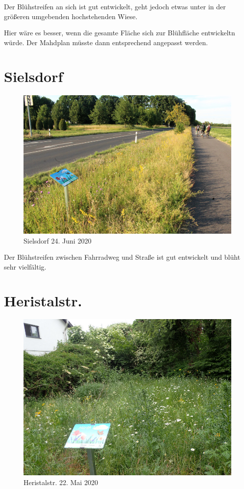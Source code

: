 \documentclass[10pt]{article}
\begin{document}
Der Blühstreifen an sich ist gut entwickelt, geht jedoch etwas unter in der größeren umgebenden hochstehenden Wiese.

Hier wäre es besser, wenn die gesamte Fläche sich zur Blühfläche entwickeltn würde. Der Mahdplan müsste dann entsprechend angepasst werden.

\clearpage
\section{Sielsdorf}
\begin{figure}[h!]
  \includegraphics[width=\linewidth]{img/sielsdorf/juni.jpg}
  \caption{Sielsdorf 24. Juni 2020}
  \label{fig:sielsdorf}
\end{figure}

Der Blühstreifen zwischen Fahrradweg und Straße ist gut entwickelt und blüht sehr vielfältig.

\clearpage
\section{Heristalstr.}
\begin{figure}[h!]
  \includegraphics[width=\linewidth]{img/heristal/mai.jpg}
  \caption{Heristalstr. 22. Mai 2020}
  \label{fig:boat1}
\end{figure}
\end{document}
